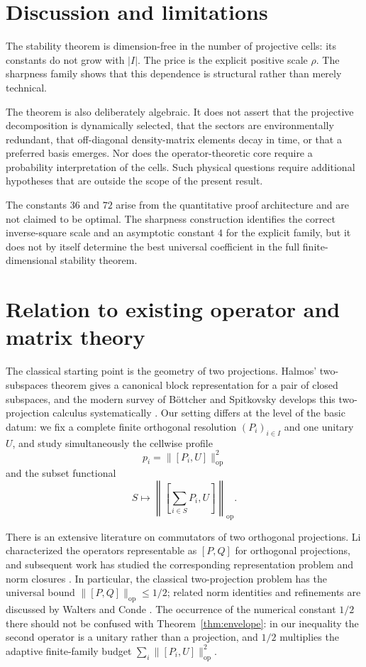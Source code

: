 \documentclass[11pt]{article}
\newcommand{\op}{\mathrm{op}}
\begin{document}
\section{Discussion and limitations}

The stability theorem is dimension-free in the number of projective cells:
its constants do not grow with $|I|$.  The price is the explicit positive
scale $\rho$.  The sharpness family shows that this dependence is structural
rather than merely technical.

The theorem is also deliberately algebraic.  It does not assert that the
projective decomposition is dynamically selected, that the sectors are
environmentally redundant, that off-diagonal density-matrix elements decay
in time, or that a preferred basis emerges.  Nor does the operator-theoretic
core require a probability interpretation of the cells.  Such physical
questions require additional hypotheses that are outside the scope of the
present result.

The constants $36$ and $72$ arise from the quantitative proof architecture
and are not claimed to be optimal.  The sharpness construction identifies the
correct inverse-square scale and an asymptotic constant $4$ for the explicit
family, but it does not by itself determine the best universal coefficient in
the full finite-dimensional stability theorem.

\section{Relation to existing operator and matrix theory}
\label{sec:related}

The classical starting point is the geometry of two projections.  Halmos'
two-subspaces theorem gives a canonical block representation for a pair of
closed subspaces, and the modern survey of B{\"o}ttcher and Spitkovsky
develops this two-projection calculus systematically
\cite{Halmos1969TwoSubspaces,BottcherSpitkovsky2010}.  Our setting differs at
the level of the basic datum: we fix a complete finite orthogonal resolution
$(P_i)_{i\in I}$ and one unitary $U$, and study simultaneously the cellwise
profile
\[
  p_i=\|[P_i,U]\|_{\op}^2
\]
and the subset functional
\[
  S\longmapsto
  \left\|
    \left[\sum_{i\in S}P_i,U\right]
  \right\|_{\op}.
\]

There is an extensive literature on commutators of two orthogonal
projections.  Li characterized the operators representable as
$[P,Q]$ for orthogonal projections, and subsequent work has studied the
corresponding representation problem and norm closures
\cite{Li2004,ShiJi2019,MarcouxRadjaviZhang2024}.  In particular, the
classical two-projection problem has the universal bound
$\|[P,Q]\|_{\op}\le1/2$; related norm identities and refinements are discussed
by Walters and Conde \cite{Conde2022}.  The occurrence of the numerical
constant $1/2$ there should not be confused with
Theorem~\ref{thm:envelope}: in our inequality the second operator is a
unitary rather than a projection, and $1/2$ multiplies the adaptive
finite-family budget
$\sum_i\|[P_i,U]\|_{\op}^2$.
\end{document}
